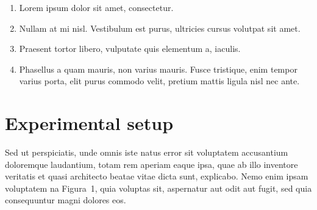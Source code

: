 \documentclass{article}
\begin{document}
\vspace{2cm}


  






\begin{enumerate}
\item Lorem ipsum dolor sit amet, consectetur.
\item Nullam at mi nisl. Vestibulum est purus, ultricies cursus
  volutpat sit amet.
\item Praesent tortor libero, vulputate quis elementum a, iaculis.
\item Phasellus a quam mauris, non varius mauris. Fusce tristique,
  enim tempor varius porta, elit purus commodo velit, pretium mattis
  ligula nisl nec ante.
\end{enumerate}

\section{Experimental setup}

Sed ut perspiciatis, unde omnis iste natus error sit voluptatem
accusantium doloremque laudantium, totam rem aperiam eaque ipsa, quae
ab illo inventore veritatis et quasi architecto beatae vitae dicta
sunt, explicabo. Nemo enim ipsam voluptatem na Figura~1, quia voluptas
sit, aspernatur aut odit aut fugit, sed quia consequuntur magni
dolores eos.
\end{document}
